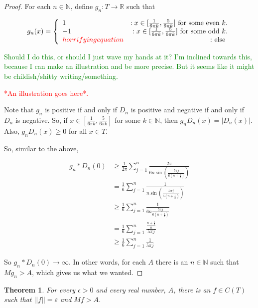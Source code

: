 \documentclass{amsart}
\newcommand{\ep}{\epsilon}
\newcommand{\vep}{\varepsilon}
\newcommand{\N}{\mathbb{N}}
\newcommand{\R}{\mathbb{R}}
\newtheorem{thm}{Theorem}[section]
\theoremstyle{definition}
\begin{document}
\begin{proof}
For each $n \in \N$, define $g_n: T \to \R$ such that 

\begin{displaymath}
   g_n(x) = \left\{
     \begin{array}{lr}
       1 & : x \in [\frac{1}{6 \pi k}, \frac{5}{6 \pi k}] $ for some even $ k.\\
       -1 & : x \in [\frac{1}{6 \pi k}, \frac{5}{6 \pi k}]$ for some odd $ k. \\
       \textcolor{red}{horrifyingequation} & : $ else $
     \end{array}
   \right.
\end{displaymath}

\textcolor{green}{Should I do this, or should I just wave my hands at it? I'm inclined towards this, because I can make an illustration and be more precise. But it seems like it might be childish/shitty writing/something.}

\textcolor{red}{*An illustration goes here*.}

Note that $g_n$ is positive if and only if $D_n$ is positive and negative if and only if $D_n$ is negative. So, if $x \in [\frac{1}{6 \pi k}, \frac{5}{6 \pi k}] $ for some $ k \in \N$, then $g_nD_n(x) = |D_n(x)|$. Also, $g_nD_n(x) \geq 0$ for all $x \in T$.

So, similar to the above,

\begin{align*}
g_n \ast D_n(0) &\geq \frac{1}{2 \pi} \sum\limits_{j=1}^n \frac{2 \pi}{6n \sin(\frac{5\pi j}{6(n+\frac{1}{2})})}\\
&= \frac{1}{6} \sum\limits_{j=1}^n \frac{1}{n \sin(\frac{5\pi j}{6(n+\frac{1}{2})})}\\
&\geq \frac{1}{6} \sum\limits_{j=1}^n \frac{1}{6n \frac{5\pi j}{6(n+\frac{1}{2})}}\\
&= \frac{1}{6} \sum\limits_{j=1}^n \frac{\frac{n+\frac{1}{2}}{n}}{5\pi j}\\
&\geq \frac{1}{6} \sum\limits_{j=1}^n \frac{1}{5\pi j}
\end{align*}

So $g_n \ast D_n(0) \to \infty$. In other words, for each $A$ there is an $n \in \N$ such that $Mg_n > A$, which gives us what we wanted.

\end{proof}

\begin{thm}
For every $\ep >0$ and every real number, $A$, there is an $f \in C(T)$ such that $||f|| = \vep $ and $Mf > A$. 

\end{thm}
\end{document}
